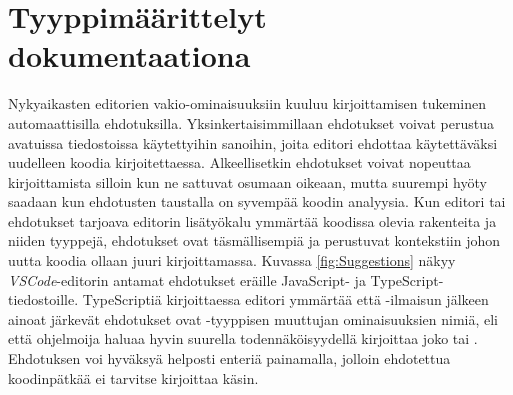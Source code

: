 \section{Tyyppimäärittelyt dokumentaationa}
Nykyaikasten editorien vakio-ominaisuuksiin kuuluu kirjoittamisen tukeminen
automaattisilla ehdotuksilla. Yksinkertaisimmillaan ehdotukset voivat
perustua avatuissa tiedostoissa käytettyihin sanoihin, joita editori ehdottaa
käytettäväksi uudelleen koodia kirjoitettaessa. Alkeellisetkin ehdotukset
voivat nopeuttaa kirjoittamista silloin kun ne sattuvat osumaan oikeaan,
mutta suurempi hyöty saadaan kun ehdotusten taustalla on syvempää koodin
analyysia. Kun editori tai ehdotukset tarjoava editorin lisätyökalu ymmärtää
koodissa olevia rakenteita ja niiden tyyppejä, ehdotukset ovat
täsmällisempiä ja perustuvat kontekstiin johon uutta koodia ollaan juuri
kirjoittamassa. Kuvassa \ref{fig:Suggestions} näkyy
\textit{VSCode}-editorin antamat ehdotukset eräille JavaScript-
ja TypeScript-tiedostoille.
TypeScriptiä kirjoittaessa editori ymmärtää että -ilmaisun
jälkeen ainoat järkevät ehdotukset ovat -tyyppisen muuttujan
ominaisuuksien nimiä, eli että ohjelmoija haluaa hyvin suurella todennäköisyydellä
kirjoittaa joko  tai .
Ehdotuksen voi hyväksyä helposti enteriä painamalla, jolloin ehdotettua
koodinpätkää ei tarvitse kirjoittaa käsin.


